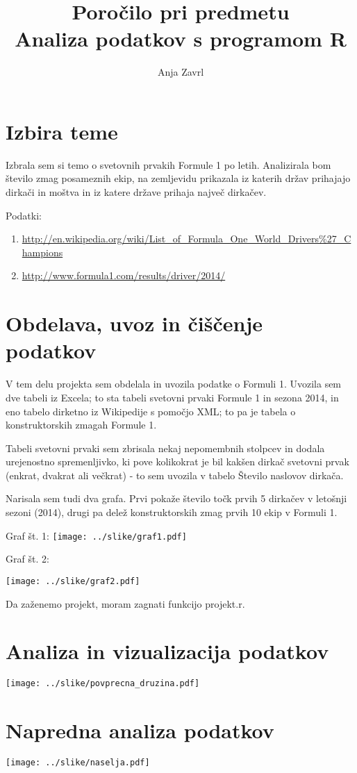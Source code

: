 \documentclass[11pt,a4paper]{article}
\begin{document}
\title{Poročilo pri predmetu \\
Analiza podatkov s programom R}
\author{Anja Zavrl}
\maketitle

\section{Izbira teme}

Izbrala sem si temo o svetovnih prvakih Formule 1 po letih. Analizirala bom število zmag posameznih ekip, na zemljevidu prikazala iz katerih držav prihajajo dirkači in moštva in iz katere države prihaja največ dirkačev. 

Podatki: 
\begin{enumerate}
\item \url{http://en.wikipedia.org/wiki/List_of_Formula_One_World_Drivers%27_Champions}
\item \url{http://www.formula1.com/results/driver/2014/}
\end{enumerate}

\section{Obdelava, uvoz in čiščenje podatkov}

V tem delu projekta sem obdelala in uvozila podatke o Formuli 1. Uvozila sem dve tabeli iz Excela; to sta tabeli
svetovni prvaki Formule 1 in sezona 2014, in eno tabelo dirketno iz Wikipedije s pomočjo XML; to pa je tabela o konstruktorskih zmagah Formule 1. 

Tabeli svetovni prvaki sem zbrisala nekaj nepomembnih stolpcev in dodala urejenostno spremenljivko, ki pove kolikokrat je bil kakšen dirkač svetovni prvak (enkrat, dvakrat ali večkrat) - to sem uvozila v tabelo Število naslovov dirkača.

Narisala sem tudi dva grafa. Prvi pokaže število točk prvih 5 dirkačev v letošnji sezoni (2014), drugi pa delež konstruktorskih zmag prvih 10 ekip v Formuli 1.

Graf št. 1:
\texttt{[image: ../slike/graf1.pdf]}

Graf št. 2:

\texttt{[image: ../slike/graf2.pdf]}

Da zaženemo projekt, moram zagnati funkcijo projekt.r.


\section{Analiza in vizualizacija podatkov}

\texttt{[image: ../slike/povprecna\_druzina.pdf]}

\section{Napredna analiza podatkov}

\texttt{[image: ../slike/naselja.pdf]}
\end{document}
